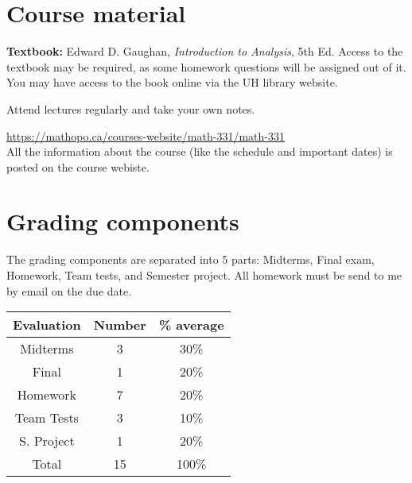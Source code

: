 \documentclass[12pt]{amsart}
\begin{document}
\section*{Course material}

\noindent\textbf{Textbook:} Edward D. Gaughan, \emph{Introduction to Analysis}, 5th Ed. Access to the textbook may be required, as some homework questions will be assigned out of it. You may have access to the book online via the UH library website.

 Attend lectures regularly and take your own notes.

 \url{https://mathopo.ca/courses-website/math-331/math-331}\\
All the information about the course (like the schedule and important dates) is posted on the course webiste.

\section*{Grading components}
The grading components are separated into 5 parts: Midterms, Final exam, Homework, Team tests, and Semester project. All homework must be send to me by email on the due date.
\begin{table}[ht]
\begin{tabular}{c|c|c}
Evaluation & Number & \% average \\ \hline\hline
Midterms & 3 & 30\% \\\hline
Final & 1 & 20\% \\\hline
Homework & 7 & 20\% \\\hline
Team Tests & 3 & 10\% \\\hline
S. Project & 1 & 20\% \\\hline\hline
Total & 15 & 100\%
\end{tabular}
\end{table}
\end{document}
